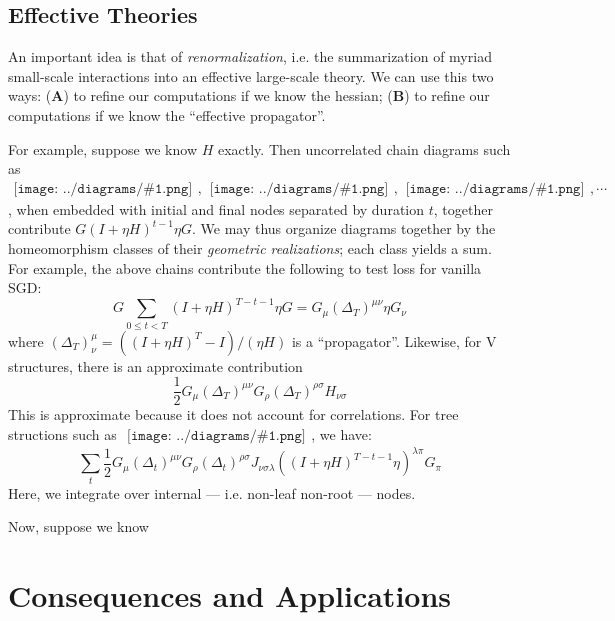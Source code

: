 \documentclass{article}
\newcommand{\sdia}[1]{\begin{gathered}\texttt{[image: ../diagrams/\#1.png]}\end{gathered}}
\begin{document}
\subsection{Effective Theories}
    An important idea is that of \emph{renormalization}, i.e. the summarization
    of myriad small-scale interactions into an effective large-scale theory.
    We can use this two ways: ({\bf A}) to refine our computations if we know
    the hessian;  ({\bf B}) to refine our computations if we know the
    ``effective propagator''.
    
    For example, suppose we know $H$ exactly.  Then uncorrelated chain diagrams
    such as $\sdia{(0-1)(01)}, \sdia{(0-1-2)(01-12)},
    \sdia{(0-1-2-3)(01-12-23)}, \cdots$, when embedded with initial and final
    nodes separated by duration $t$, together contribute $G (I+\eta H)^{t-1} \eta
    G$.  We may thus organize diagrams together by the homeomorphism classes
    of their \emph{geometric realizations}; each class yields a sum.  For
    example, the above chains contribute the following to test loss for vanilla
    SGD:
    \begin{equation}
        G \sum_{0\leq t<T} (I+\eta H)^{T-t-1} \eta G
        =
        G_\mu (\Delta_T)^{\mu\nu} \eta G_\nu
    \end{equation}
    where $(\Delta_T)^\mu_\nu = ((I+\eta H)^T - I)/(\eta H)$ is a ``propagator''.
    Likewise, for V structures, there is an approximate contribution
    \begin{equation}
        \frac{1}{2} G_\mu (\Delta_T)^{\mu\nu} G_\rho (\Delta_T)^{\rho\sigma} H_{\nu\sigma}  
    \end{equation}
    This is approximate because it does not account for correlations.
    For tree structions such as $\sdia{(0-1-2-3)(02-12-23)}$, we have:
    \begin{equation}
        \sum_t \frac{1}{2} G_\mu (\Delta_t)^{\mu\nu} G_\rho (\Delta_t)^{\rho\sigma}
               J_{\nu\sigma\lambda} ((I+\eta H)^{T-t-1} \eta)^{\lambda\pi} G_\pi
    \end{equation}
    Here, we integrate over internal --- i.e. non-leaf non-root --- nodes.

    Now, suppose we know



\section{Consequences and Applications}
\end{document}
